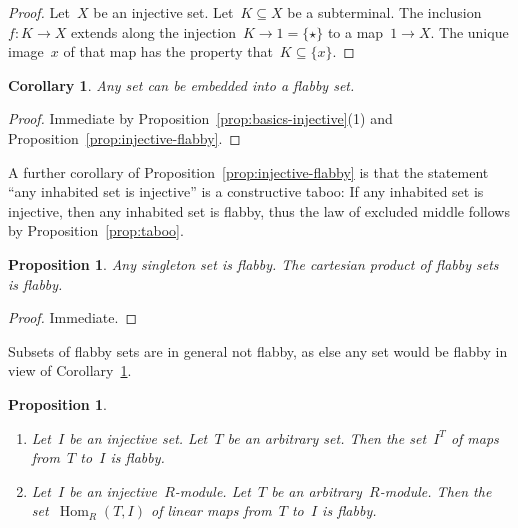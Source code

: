 \documentclass[oneside]{amsart}
\theoremstyle{definition}
\theoremstyle{plain}
\newtheorem{prop}[defn]{Proposition}
\newtheorem{cor}[defn]{Corollary}
\theoremstyle{remark}
\DeclareMathOperator{\Hom}{Hom}
\renewcommand{\_}{\mathpunct{.}\,}
\begin{document}
\begin{proof}Let~$X$ be an injective set. Let~$K \subseteq X$ be a subterminal.
The inclusion~$f : K \to X$ extends along the injection~$K \to 1 = \{\star\}$
to a map~$1 \to X$. The unique image~$x$ of that map has the property that~$K
\subseteq \{x\}$.\end{proof}

\begin{cor}\label{cor:enough-flabby-sets}
Any set can be embedded into a flabby set.\end{cor}

\begin{proof}Immediate by Proposition~\ref{prop:basics-injective}(1) and
Proposition~\ref{prop:injective-flabby}.\end{proof}

A further corollary of Proposition~\ref{prop:injective-flabby} is that the
statement ``any inhabited set is injective'' is a constructive taboo: If any
inhabited set is injective, then any inhabited set is flabby, thus the law of
excluded middle follows by Proposition~\ref{prop:taboo}.

\begin{prop}Any singleton set is flabby. The cartesian product of flabby sets
is flabby.\end{prop}

\begin{proof}Immediate.\end{proof}

Subsets of flabby sets are in general not flabby, as else any set would be
flabby in view of Corollary~\ref{cor:enough-flabby-sets}.

\begin{prop}\label{prop:hom-flabby}
\begin{enumerate}
\item Let~$I$ be an injective set. Let~$T$ be an arbitrary set. Then the
set~$I^T$ of maps from~$T$ to~$I$ is flabby.
\item Let~$I$ be an injective~$R$-module. Let~$T$ be an arbitrary~$R$-module. Then the
set~$\Hom_R(T,I)$ of linear maps from~$T$ to~$I$ is flabby.
\end{enumerate}\end{prop}
\end{document}
